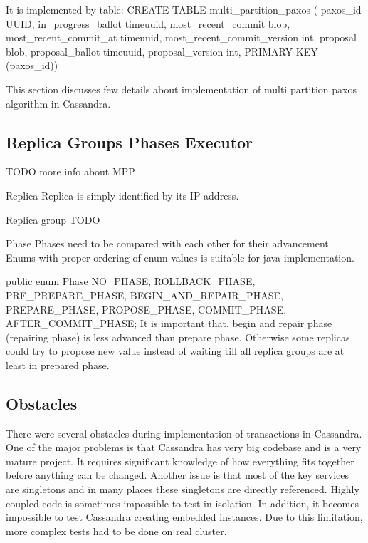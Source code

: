 It is implemented by table:
CREATE TABLE multi_partition_paxos (
paxos_id UUID,
in_progress_ballot timeuuid,
most_recent_commit blob,
most_recent_commit_at timeuuid,
most_recent_commit_version int,
proposal blob,
proposal_ballot timeuuid,
proposal_version int,
PRIMARY KEY (paxos_id))




This section discusses few details about implementation of multi partition paxos algorithm in Cassandra.

\subsection{Replica Groups Phases Executor}

TODO more info about MPP


Replica
Replica is simply identified by its IP address. 


Replica group
TODO


Phase
Phases need to be compared with each other for their advancement. Enums with proper ordering of enum values is suitable for java implementation.


public enum Phase
{
   NO_PHASE,
   ROLLBACK_PHASE,
   PRE_PREPARE_PHASE,
   BEGIN_AND_REPAIR_PHASE,
   PREPARE_PHASE,
   PROPOSE_PHASE,
   COMMIT_PHASE,
   AFTER_COMMIT_PHASE;
}
It is important that, begin and repair phase (repairing phase) is less advanced than prepare phase. Otherwise some replicas could try to propose new value instead of waiting till all replica groups are at least in prepared phase.







\subsection{Obstacles}
There were several obstacles during implementation of transactions in Cassandra. One of the major problems is that Cassandra has very big codebase and is a very mature project. It requires significant knowledge of how everything fits together before anything can be changed. 
Another issue is that most of the key services are singletons and in many places these singletons are directly referenced. Highly coupled code is sometimes impossible to test in isolation. In addition, it becomes impossible to test Cassandra creating embedded instances. Due to this limitation, more complex tests had to be done on real cluster.

